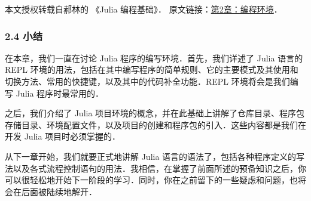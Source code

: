 
本文授权转载自郝林的 《Julia 编程基础》． 原文链接：\href{https://github.com/hyper0x/JuliaBasics/blob/master/book/ch02.md}{第2章：编程环境}．

\subsubsection{2.4 小结}

在本章，我们一直在讨论 Julia 程序的编写环境．首先，我们详述了 Julia 语言的 REPL 环境的用法，包括在其中编写程序的简单规则、它的主要模式及其使用和切换方法、常用的快捷键，以及其中的代码补全功能．REPL 环境将会是我们编写 Julia 程序时最常用的．

之后，我们介绍了 Julia 项目环境的概念，并在此基础上讲解了仓库目录、程序包存储目录、环境配置文件，以及项目的创建和程序包的引入．这些内容都是我们在开发 Julia 项目时必须掌握的．

从下一章开始，我们就要正式地讲解 Julia 语言的语法了，包括各种程序定义的写法以及各式流程控制语句的用法．我相信，在掌握了前面所述的预备知识之后，你可以很轻松地开始下一阶段的学习．同时，你在之前留下的一些疑虑和问题，也将会在后面被陆续地解开．
